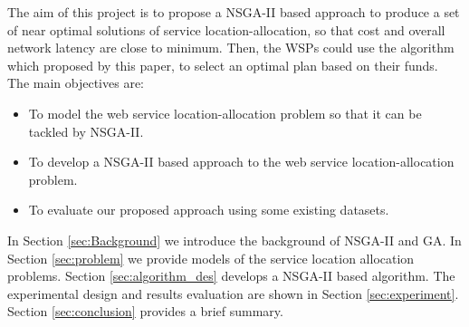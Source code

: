 \documentclass{llncs}
\begin{document}
The aim of this project is to propose a NSGA-II based approach to produce a set of near optimal solutions of service location-allocation, so that cost and overall network latency are 
close to minimum. Then, the WSPs could use the algorithm which proposed by this paper, to select an optimal plan based on their funds. 
The main objectives are:
\begin{itemize}
	\item To model the web service location-allocation problem so that it can be tackled by NSGA-II.
	\item To develop a NSGA-II based approach to the web service location-allocation problem.
	\item To evaluate our proposed approach using some existing datasets.
\end{itemize}

In Section \ref{sec:Background} we introduce the background of NSGA-II and GA.
In Section \ref{sec:problem} we provide models of the service location allocation problems. Section \ref{sec:algorithm_des} develops a NSGA-II based algorithm. 
The experimental design and results evaluation are shown in Section \ref{sec:experiment}. Section \ref{sec:conclusion} provides a brief summary.
\end{document}
